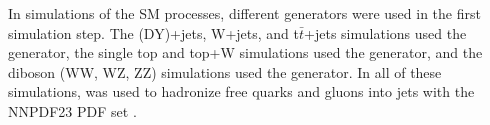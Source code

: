 In simulations of the SM processes, different \MC generators were used in the first simulation step.  
The \DY (DY)+jets, W+jets, and t$\bar{t}$+jets simulations used the \MADGRAPH \cite{madgraph} generator, 
the single top and top+W simulations used the \POWHEG \cite{powheg} generator, and the diboson (WW, WZ, ZZ) 
simulations used the \PYTHIA \cite{pythia8,Sjostrand:2006za} generator.  In all of these 
simulations, \PYTHIA was used to hadronize free quarks and gluons into jets with the NNPDF23 PDF set 
\cite{nnpdf}.


